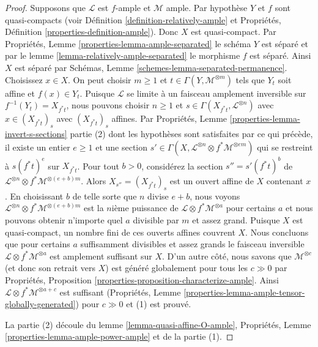 \begin{proof}
Supposons que $\mathcal{L}$ est $f$-ample et $\mathcal{M}$
ample. Par hypothèse $Y$
et $f$ sont quasi-compacts (voir Définition
\ref{definition-relatively-ample} et Propriétés, Définition \ref{properties-definition-ample}).
Donc $X$ est quasi-compact.
Par Propriétés, Lemme \ref{properties-lemma-ample-separated} le schéma $Y$
est séparé et par le lemme \ref{lemma-relatively-ample-separated} le morphisme
$f$ est séparé. Ainsi $X$ est
séparé par Schémas, Lemme \ref{schemes-lemma-separated-permanence}. Choisissez
$x \in X$. On peut choisir $m \geq 1$
et $t \in \Gamma(Y, \mathcal{M}^{\otimes m})$ tels que $Y_t$ soit affine et
$f(x) \in Y_t$. Puisque $\mathcal{L}$ se limite à un faisceau
amplement inversible sur $f^{-1}(Y_t) = X_{f^*t}$, nous
pouvons choisir $n \geq 1$ et $s \in \Gamma(X_{f^*t}, \mathcal{L}^{\otimes n})$ avec $x \in (X_{f^*t})_s$ avec
$(X_{f^*t})_s$ affines. Par Propriétés, Lemme
\ref{properties-lemma-invert-s-sections} partie (2) dont les hypothèses sont satisfaites
par ce qui précède, il existe
un entier $e \geq 1$ et une section
$s' \in \Gamma(X, \mathcal{L}^{\otimes n} \otimes f^*\mathcal{M}^{\otimes em})$ qui se restreint à $s(f^*t)^e$ sur $X_{f^*t}$. Pour
tout $b > 0$, considérez la section $s'' = s'(f^*t)^b$
de $\mathcal{L}^{\otimes n} \otimes f^*\mathcal{M}^{\otimes (e + b)m}$. Alors $X_{s''} = (X_{f^*t})_s$
est un ouvert affine de $X$ contenant $x$.
En choisissant $b$ de telle sorte que $n$
divise $e + b$, nous voyons
$\mathcal{L}^{\otimes n} \otimes f^*\mathcal{M}^{\otimes (e + b)m}$ est la $n$ième puissance de $\mathcal{L} \otimes f^*\mathcal{M}^{\otimes a}$
pour certains $a$ et nous pouvons obtenir n'importe quel
$a$ divisible par $m$ et assez grand. Puisque
$X$ est quasi-compact, un nombre fini de
ces ouverts affines couvrent $X$. Nous concluons
que pour certains $a$
suffisamment divisibles et assez grands le faisceau inversible
$\mathcal{L} \otimes f^*\mathcal{M}^{\otimes a}$ est amplement suffisant sur $X$.
D'un autre côté, nous savons que $\mathcal{M}^{\otimes c}$ (et donc
son retrait vers $X$) est généré globalement pour tous
les $c \gg 0$ par Propriétés, Proposition \ref{properties-proposition-characterize-ample}.
Ainsi $\mathcal{L} \otimes f^*\mathcal{M}^{\otimes a + c}$ est suffisant (Propriétés, Lemme \ref{properties-lemma-ample-tensor-globally-generated})
pour $c \gg 0$ et (1) est prouvé.

\medskip\noindent
La partie (2) découle du lemme \ref{lemma-quasi-affine-O-ample},
Propriétés, Lemme \ref{properties-lemma-ample-power-ample} et de la partie
(1).
\end{proof}

